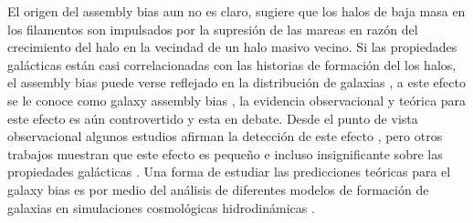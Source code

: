 \documentclass{bmcart}
\begin{document}
El origen del assembly bias aun no es claro, 
\cite{doi:10.1111/j.1365-2966.2009.15271.x} sugiere que los halos de baja masa 
en los filamentos son impulsados por la supresión de las mareas en razón del 
crecimiento del halo en la vecindad de un halo masivo vecino. Si las 
propiedades galácticas están casi correlacionadas con las historias de 
formación del los halos, el assembly bias puede verse reflejado en la 
distribución de galaxias \cite{2018arXiv180506938A}, a este efecto se le conoce 
como galaxy assembly bias 
\cite{2006ApJ...639L...5Z}\cite{2007MNRAS.374.1303C}\cite{2016MNRAS.460.3100C}, 
la evidencia observacional y teórica para este efecto es aún controvertido y 
esta en debate. Desde el punto de vista observacional algunos estudios afirman 
la detección de este efecto 
\cite{1538-4357-638-2-L55}\cite{2014MNRAS.443.3107L}\cite{2017MNRAS.472.2504T}, 
pero  otros trabajos muestran que este efecto es pequeño e incluso 
insignificante sobre las propiedades galácticas 
\cite{2007ApJ...664..791B}\cite{2017MNRAS.468.3251D}. Una forma de estudiar las 
predicciones teóricas para el galaxy bias es por medio del análisis de 
diferentes modelos de formación de galaxias en simulaciones cosmológicas 
hidrodinámicas \cite{2018arXiv180506938A}.\\
\end{document}
